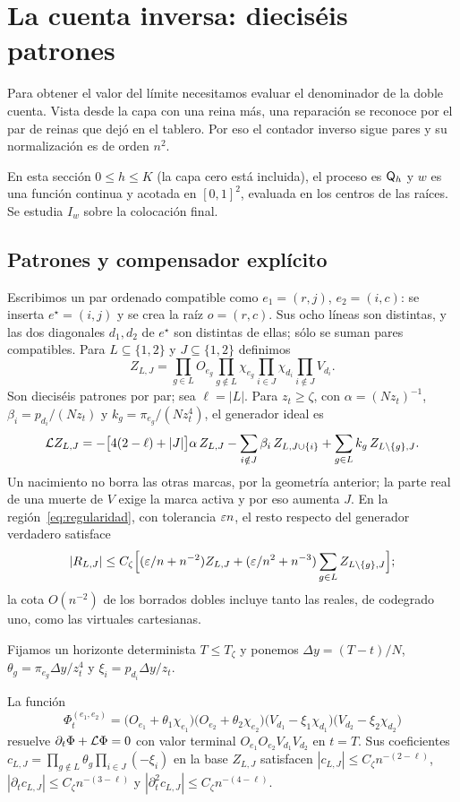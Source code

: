 \section{La cuenta inversa: dieciséis patrones}\label{sec:inversa}

Para obtener el valor del límite necesitamos evaluar el denominador de la doble
cuenta. Vista desde la capa con una reina más, una reparación se reconoce por el
par de reinas que dejó en el tablero. Por eso el contador inverso sigue pares y
su normalización es de orden $n^2$.

En esta sección $0\le h\le K$ (la capa cero está incluida), el proceso es $\mathsf{Q}_h$ y $w$ es una
función continua y acotada en $[0,1]^2$, evaluada en los centros de las raíces. Se estudia
$I_w$ sobre la colocación final.

\subsection{Patrones y compensador explícito}

Escribimos un par ordenado compatible como $e_1=(r,j)$, $e_2=(i,c)$: se inserta $e^\star=(i,j)$
y se crea la raíz $o=(r,c)$. Sus ocho líneas son distintas, y las dos diagonales $d_1,d_2$ de
$e^\star$ son distintas de ellas; sólo se suman pares compatibles. Para
$L\subseteq\{1,2\}$ y $J\subseteq\{1,2\}$ definimos
\[
 Z_{L,J}=\prod_{g\in L}O_{e_g}\prod_{g\notin L}\chi_{e_g}\prod_{i\in J}\chi_{d_i}\prod_{i\notin J}V_{d_i}.
\]
Son dieciséis patrones por par; sea $\ell=|L|$. Para $z_t\ge\zeta$, con
$\alpha=(Nz_t)^{-1}$, $\beta_i=p_{d_i}/(Nz_t)$ y $k_g=\pi_{e_g}/(Nz_t^4)$, el generador ideal es
\[
 \mathcal{L} Z_{L,J}=-\bigl[4(2-\ell)+|J|\bigr]\alpha\,Z_{L,J}-\sum_{i\notin J}\beta_i\,Z_{L,J\cup\{i\}}
 +\sum_{g\in L}k_g\,Z_{L\setminus\{g\},J}.
\]
Un nacimiento no borra las otras marcas, por la geometría anterior; la parte real de una muerte
de $V$ exige la marca activa y por eso aumenta $J$. En la región~\eqref{eq:regularidad}, con tolerancia
$\varepsilon n$, el
resto respecto del generador verdadero satisface
\[
 |R_{L,J}|\le C_\zeta\Bigl[(\varepsilon/n+n^{-2})Z_{L,J}+(\varepsilon/n^2+n^{-3})\sum_{g\in L}Z_{L\setminus\{g\},J}\Bigr];
\]
la cota $O(n^{-2})$ de los borrados dobles incluye tanto las reales, de codegrado uno, como las
virtuales cartesianas.

Fijamos un horizonte determinista $T\le T_\zeta$ y ponemos $\Delta y=(T-t)/N$,
$\theta_g=\pi_{e_g}\Delta y/z_t^4$ y $\xi_i=p_{d_i}\Delta y/z_t$.

\begin{lema}[Compensador]\label{lem:compensador}
La función
\[
 \Phi^{(e_1,e_2)}_t=\bigl(O_{e_1}+\theta_1\chi_{e_1}\bigr)\bigl(O_{e_2}+\theta_2\chi_{e_2}\bigr)
 \bigl(V_{d_1}-\xi_1\chi_{d_1}\bigr)\bigl(V_{d_2}-\xi_2\chi_{d_2}\bigr)
\]
resuelve $\partial_t\Phi+\mathcal{L}\Phi=0$ con valor terminal
$O_{e_1}O_{e_2}V_{d_1}V_{d_2}$ en $t=T$. Sus coeficientes
$c_{L,J}=\prod_{g\notin L}\theta_g\prod_{i\in J}(-\xi_i)$ en la base $Z_{L,J}$ satisfacen
$|c_{L,J}|\le C_\zeta n^{-(2-\ell)}$, $|\partial_tc_{L,J}|\le C_\zeta n^{-(3-\ell)}$ y
$|\partial_t^2c_{L,J}|\le C_\zeta n^{-(4-\ell)}$.
\end{lema}

